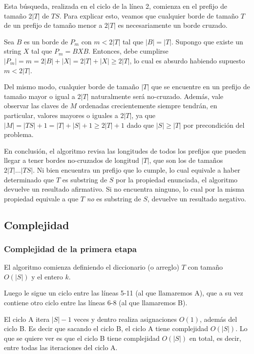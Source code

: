 Esta búsqueda, realizada en el ciclo de la línea 2, comienza en el prefijo de tamaño $2|T|$ de $TS$. Para explicar esto, veamos que cualquier borde de tamaño $T$ de un prefijo de tamaño menor a $2|T|$ es necesariamente un borde cruzado.

Sea $B$ es un borde de $P_m$ con $m < 2|T|$ tal que $|B| = |T|$. Supongo que existe un string $X$ tal que $P_m = BXB$. Entonces, debe cumplirse $|P_m| = m = 2|B|+|X| = 2|T| + |X| \geq 2|T|$, lo cual es absurdo habiendo supuesto $m < 2|T|$.

Del mismo modo, cualquier borde de tamaño $|T|$ que se encuentre en un prefijo de tamaño mayor o igual a $2|T|$ naturalmente será no-cruzado. Además, vale observar las claves de $M$ ordenadas crecientemente siempre tendrán, en particular, valores mayores o iguales a $2|T|$, ya que $|M| = |TS|+1 = |T|+|S|+1 \geq 2|T| + 1$ dado que $|S| \geq |T|$ por precondición del problema.

En conclusión, el algoritmo revisa las longitudes de todos los prefijos que pueden llegar a tener bordes no-cruzados de longitud $|T|$, que son los de tamaños $2|T| \dots |TS|$. Ni bien encuentra un prefijo que lo cumple, lo cual equivale a haber determinado que $T$ es substring de $S$ por la propiedad enunciada, el algoritmo devuelve un resultado afirmativo. Si no encuentra ninguno, lo cual por la misma propiedad equivale a que $T$ \textit{no} es substring de $S$, devuelve un resultado negativo.
 
\subsection{Complejidad}

\subsubsection{Complejidad de la primera etapa}

El algoritmo comienza definiendo el diccionario (o arreglo) $T$ con tamaño $O(|S|)$ y el entero $k$.

Luego le sigue un ciclo entre las líneas 5-11 (al que llamaremos A), que a su vez contiene otro ciclo
entre las líneas 6-8 (al que llamaremos B).

El ciclo A itera $|S|-1$ veces y dentro realiza asignaciones $O(1)$, además del ciclo B. Es decir que
sacando el ciclo B, el ciclo A tiene complejidad $O(|S|)$. Lo que se quiere ver es que el ciclo B tiene
complejidad $O(|S|)$ en total, es decir, entre todas las iteraciones del ciclo A.

